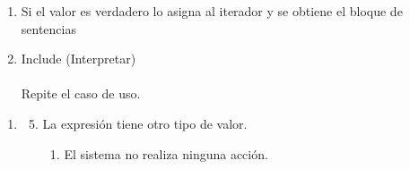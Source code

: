 \begin{framed}
\begin{description}
\begin{enumerate}
\begin {enumerate}
\begin{enumerate}
         \item Si el valor es verdadero lo asigna al iterador y se obtiene el bloque de sentencias
         \item Include (Interpretar) \\ \\ \hfill
         Repite el caso de uso.
         \end{enumerate}
      \end{enumerate}
   \end{enumerate}
   \begin{enumerate} \itemsep1pt \parskip0pt 
   \setcounter{enumi}{2}
   \renewcommand{\labelenumi}{}
   \renewcommand{\labelenumiii}{\arabic{enumiii}.}
   \renewcommand{\labelenumii}{\arabic{enumi}\alph{enumii}.}
      \item 
      \begin {enumerate}
         \setcounter{enumii}{4}
         \item La expresión tiene otro tipo de valor.
         \begin{enumerate}
         \item El sistema no realiza ninguna acción.
         \end{enumerate}
      \end{enumerate}
   \end{enumerate}
\end{description}
 \FloatBarrier
\end{framed}
